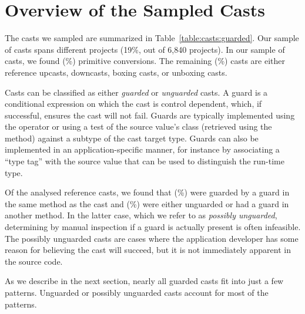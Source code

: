 \section{Overview of the Sampled Casts}\label{sec:casts:overview}

The casts we sampled are summarized in Table~\ref{table:casts:guarded}.
Our sample of casts spans \nUniqueProjects{} different projects
(19\%, out of 6,840 projects).
In our sample of \nSize{} casts,
we found \nPrimitivePattern{} (\pPrimitivePattern\%) primitive conversions.
The remaining \nReference{} (\pReference\%) casts are either reference upcasts,
downcasts, boxing casts, or unboxing casts.



Casts can be classified as either \emph{guarded} or \emph{unguarded} casts.
A guard is a conditional expression on which the cast is control dependent,
which, if successful, ensures the cast will not fail.
Guards are typically implemented using the  operator or using
a test of the source value's class (retrieved using the
 method) against a subtype of the cast target type.
Guards can also be implemented in an application-specific manner, for instance
by associating a ``type tag'' with the source value that can be used to
distinguish the run-time type.

Of the \nReference{} analysed reference casts,
we found that \nGuarded{} (\pGuarded\%) were guarded by a
guard in the same method as the cast and \nUnguarded{} (\pUnguarded\%)
were either unguarded or had a guard in another method.
In the latter case, which we refer to as \emph{possibly unguarded},
determining by manual inspection if a guard is actually
present is often infeasible. The possibly unguarded casts are cases where the application developer
has some reason for believing the cast will succeed, but it is not immediately
apparent in the source code.

As we describe in the next section,
nearly all guarded casts fit into just a few patterns.
Unguarded or possibly unguarded casts account for most of the patterns.
